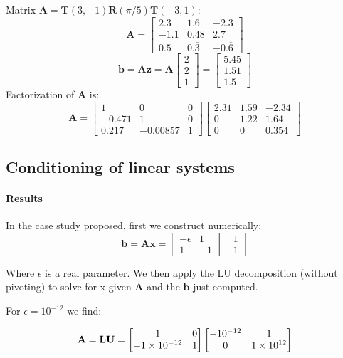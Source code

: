 \documentclass[a4paper,11]{article}
\begin{document}
Matrix $\mathbf{A}=\mathbf{T}(3,-1)\mathbf{R}(\pi/5)\mathbf{T}(-3,1):$
\[
\mathbf{A}=\begin{bmatrix}
	2.3 & 1.6 & -2.3\\
	-1.1 & 0.48 & 2.7\\
	0.5 & 0.\overline{3} & -0.\overline{6}
\end{bmatrix}
\]
\[
\mathbf{b}=\mathbf{A}\mathbf{z}=\mathbf{A}\begin{bmatrix}
2 \\ 2 \\ 1
\end{bmatrix}
=\begin{bmatrix}
5.45 \\ 1.51 \\ 1.5
\end{bmatrix}
\]
Factorization of $\mathbf{A}$ is:
\[
\mathbf{A}=
\begin{bmatrix}
	1 & 0 & 0\\
	-0.471 & 1 & 0\\
	0.217 & -0.00857 & 1
\end{bmatrix}
\begin{bmatrix}
	2.31 & 1.59 & -2.34\\
	0 & 1.22 & 1.64\\
	0 & 0 & 0.354
\end{bmatrix}
\]
\subsection{Conditioning of linear systems}

\paragraph{Results}

In the case study proposed, first we construct numerically:
\[
	\mathbf{b}=\mathbf{A}\mathbf{x}=
	\begin{bmatrix}
	-\epsilon & 1 \\
	1 & -1
	\end{bmatrix}
	\begin{bmatrix} 1 \\ 1 \end{bmatrix}
\]

Where $\epsilon$ is a real parameter.
We then apply the LU decomposition (without pivoting) to 
solve for x given $\mathbf{A}$ and the $\mathbf{b}$ just computed.

For $\epsilon = 10^{-12}$ we find:

\[
	\mathbf{A}=\mathbf{LU}=
	\begin{bmatrix}
		1 & 0 \\
		\num{-1e-12} & 1\\
	\end{bmatrix}
	\begin{bmatrix}
		\num{-e-12} & 1 \\
		0 & \num{1e12} \\
	\end{bmatrix} 
\]
\end{document}
